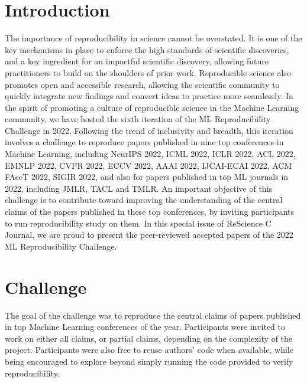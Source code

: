 
\section{Introduction}

The importance of reproducibility in science cannot be overstated. It is one of the key mechanisms in place to enforce the high standards of scientific discoveries, and a key ingredient for an impactful scientific discovery, allowing future practitioners to build on the shoulders of prior work. Reproducible science also promotes open and accessible research, allowing the scientific community to quickly integrate new findings and convert ideas to practice more seamlessly. In the spirit of promoting a culture of reproducible science in the Machine Learning community, we have hosted the sixth iteration of the ML Reproducibility Challenge in 2022.
Following the trend of inclusivity and breadth, this iteration involves a challenge to reproduce papers published in nine top conferences in Machine Learning, including NeurIPS 2022, ICML 2022, ICLR 2022, ACL 2022, EMNLP 2022, CVPR 2022, ECCV 2022, AAAI 2022, IJCAI-ECAI 2022, ACM FAccT 2022, SIGIR 2022, and also for papers published in top ML journals in 2022, including JMLR, TACL and TMLR. An important objective of this challenge is to contribute toward improving the understanding of the central claims of the papers published in these top conferences, by inviting participants to run reproducibility study on them. In this special issue of ReScience C Journal, we are proud to present the peer-reviewed accepted papers of the 2022 ML Reproducibility Challenge.

\section{Challenge}

The goal of the challenge was to reproduce the central claims of papers published in top Machine Learning conferences of the year. Participants were invited to work on either all claims, or partial claims, depending on the complexity of the project. Participants were also free to reuse authorsʼ code when available, while being encouraged to explore beyond simply running the code provided to verify reproducibility. 


